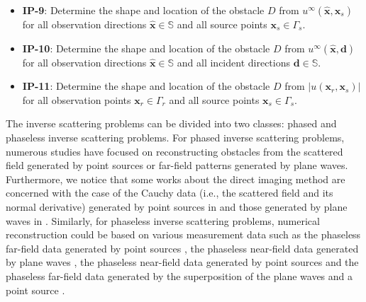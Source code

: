 \documentclass[10pt,a4paper]{article}
\numberwithin{equation}{section}
\begin{document}
\begin{itemize}
  \item \textbf{IP-9}: Determine the shape and location of the obstacle $D$
    from 
    $u^{\infty}(\hat{ \bm x },  \bm{ x }_{s})$
  for all observation directions $\hat{ \bm x } \in \mathbb{S}$ and  all source points $\bm{ x }_s \in \Gamma_s$.
  
  \item \textbf{IP-10}:  Determine the shape and location of the obstacle $D$
    from 
    $u^{\infty}(\hat{ \bm x }, \bm{ d })$
  for all observation directions $\hat{ \bm x } \in \mathbb{S}$ and  all incident directions  $\bm{ d } \in \mathbb{S}$.
  
  \item \textbf{IP-11}: Determine the shape and location of the obstacle $D$
    from 
    $|u(\bm{ x }_r, \bm{ x }_s)|$
  for all observation points $\bm{ x }_r \in \Gamma_r$ and all source points $\bm{ x }_s \in \Gamma_s$.
\end{itemize}

The inverse scattering problems can be divided into two classes: phased and phaseless inverse scattering problems.
For phased inverse scattering problems, numerous studies have focused on reconstructing obstacles from the scattered field generated by point sources or far-field patterns generated by plane waves. Furthermore, we  notice that some works about the direct imaging method are concerned with the case of  the Cauchy data (i.e., the scattered field and its normal derivative) generated by point sources in \cite{Harris_direct_2022} and those generated by plane waves in \cite{Nguyen_numerical_2023}. Similarly, for phaseless inverse scattering problems,  numerical reconstruction could be based on various measurement data such as the phaseless far-field data generated by point sources  \cite{yang_bayesian_2020},  the phaseless near-field data generated by plane waves \cite{zhang_approximate_2020}, the phaseless near-field data generated by point sources \cite{chen_phaseless_2017} and the phaseless far-field data generated by the superposition of the plane waves and a point source \cite{ji_acoustic_2019}.
\end{document}

